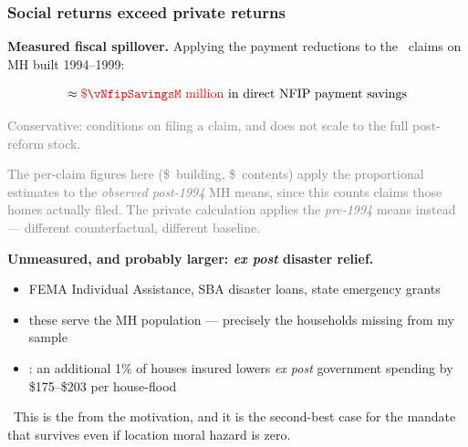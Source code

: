 \documentclass[11pt,xcolor={dvipsnames},hyperref={pdftex,pdfpagemode=UseNone,hidelinks,pdfdisplaydoctitle=true},usepdftitle=false,aspectratio=169]{beamer}
\newcommand{\gc}[1]{{\footnotesize\textcolor{gray}{#1}}}
\begin{document}
\begin{frame}[t]
    \frametitle{Social returns exceed private returns}

    \textbf{Measured fiscal spillover.} Applying the payment reductions to the \vNPostClaims\ claims on MH built 1994--1999:

    $$\approx \al{\$\vNfipSavingsM\ \text{million}} \text{ in direct NFIP payment savings}$$

    \gc{Conservative: conditions on filing a claim, and does not scale to the full post-reform stock.}

    \vspace{0.4em}

    \gc{\scriptsize The per-claim figures here (\$\vNetBldgPmtDol\ building, \$\vNetContPmtDol\ contents) apply the proportional estimates to the \emph{observed post-1994} MH means, since this counts claims those homes actually filed. The private calculation applies the \emph{pre-1994} means instead --- different counterfactual, different baseline.}

    \vspace{1.2em}
    \pause

    \textbf{Unmeasured, and probably larger: \emph{ex post} disaster relief.}
    \begin{itemize}
        \item FEMA Individual Assistance, SBA disaster loans, state emergency grants
        \item these serve the  MH population --- precisely the households missing from my sample
        \item \cite{solomon_optimal_2026}: an additional 1\% of houses insured lowers \emph{ex post} government spending by \$175--\$203 per house-flood
    \end{itemize}

    \vspace{1.0em}
    \pause

    \so\ This is the  from the motivation, and it is the second-best case for the mandate that survives even if location moral hazard is zero.

\end{frame}
\end{document}
